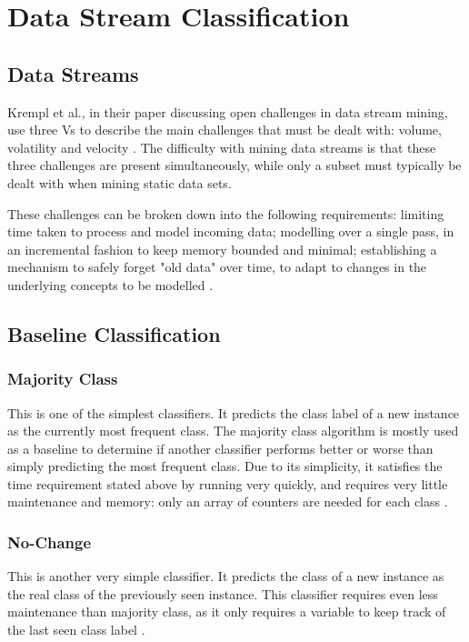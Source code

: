 \section{Data Stream Classification}
\subsection{Data Streams}
Krempl et al., in their paper discussing open challenges in data stream mining, use three Vs to describe the main challenges that must be dealt with: volume, volatility and velocity \cite{krempl2014open}. The difficulty with mining data streams is that these three challenges are present simultaneously, while only a subset must typically be dealt with when mining static data sets.

These challenges can be broken down into the following requirements: limiting time taken to process and model incoming data; modelling over a single pass, in an incremental fashion to keep memory bounded and minimal; establishing a mechanism to safely forget "old data" over time, to adapt to changes in the underlying concepts to be modelled \cite{gama2010knowledge, gama2014survey, ghesmoune2016state, KRAWCZYK2017132, krempl2014open, silva2013data, widmer1996learning}.

\subsection{Baseline Classification}
\subsubsection{Majority Class}
This is one of the simplest classifiers. It predicts the class label of a new instance as the currently most frequent class. The majority class algorithm is mostly used as a baseline to determine if another classifier performs better or worse than simply predicting the most frequent class. Due to its simplicity, it satisfies the time requirement stated above by running very quickly, and requires very little maintenance and memory: only an array of counters are needed for each class \cite{bifet2018machine}.

\subsubsection{No-Change}
This is another very simple classifier. It predicts the class of a new instance as the real class of the previously seen instance. This classifier requires even less maintenance than majority class, as it only requires a variable to keep track of the last seen class label \cite{bifet2018machine}.


